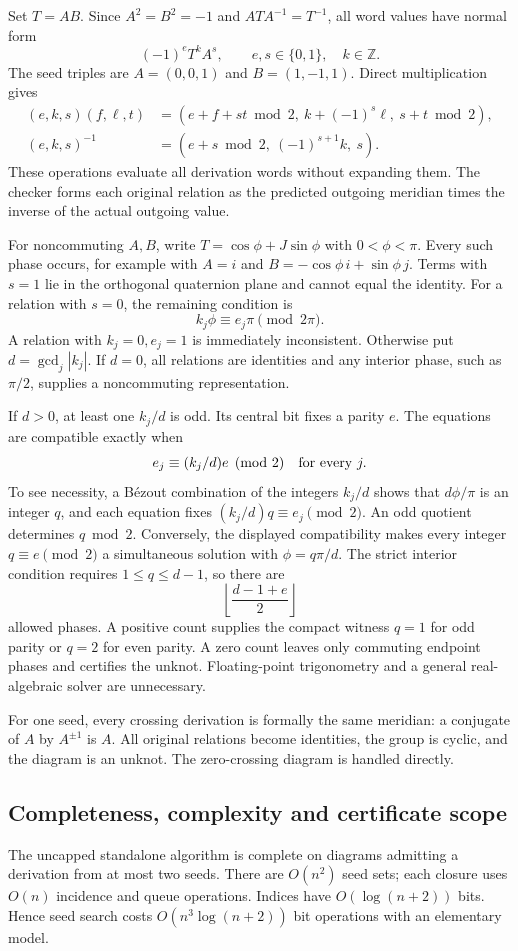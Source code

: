 Set $T=AB$. Since $A^2=B^2=-1$ and $ATA^{-1}=T^{-1}$, all word values have
normal form
\[
 (-1)^eT^kA^s,\qquad e,s\in\{0,1\},\quad k\in\mathbb Z.
\]
The seed triples are $A=(0,0,1)$ and $B=(1,-1,1)$. Direct multiplication gives
\begin{align*}
 (e,k,s)(f,\ell,t)&=(e+f+st\bmod2,\ k+(-1)^s\ell,\ s+t\bmod2),\\
 (e,k,s)^{-1}&=(e+s\bmod2,\ (-1)^{s+1}k,\ s).
\end{align*}
These operations evaluate all derivation words without expanding them.
The checker forms each original relation as the predicted outgoing meridian
times the inverse of the actual outgoing value.

For noncommuting $A,B$, write $T=\cos\phi+J\sin\phi$ with
$0<\phi<\pi$. Every such phase occurs, for example with
$A=i$ and $B=-\cos\phi\,i+\sin\phi\,j$. Terms with $s=1$ lie in the
orthogonal quaternion plane and cannot equal the identity. For a relation
with $s=0$, the remaining condition is
\[
 k_j\phi\equiv e_j\pi\pmod{2\pi}.
\]
A relation with $k_j=0,e_j=1$ is immediately inconsistent. Otherwise put
$d=\gcd_j|k_j|$. If $d=0$, all relations are identities and any interior
phase, such as $\pi/2$, supplies a noncommuting representation.

If $d>0$, at least one $k_j/d$ is odd. Its central bit fixes a parity $e$.
The equations are compatible exactly when
\[
 e_j\equiv(k_j/d)e\pmod2\quad\hbox{for every }j.
\]
To see necessity, a B\'ezout combination of the integers $k_j/d$ shows that
$d\phi/\pi$ is an integer $q$, and each equation fixes
$(k_j/d)q\equiv e_j\pmod2$. An odd quotient determines $q\bmod2$.
Conversely, the displayed compatibility makes every integer $q\equiv e\pmod2$
a simultaneous solution with $\phi=q\pi/d$.
The strict interior condition requires $1\le q\le d-1$, so there are
\[
 \left\lfloor\frac{d-1+e}{2}\right\rfloor
\]
allowed phases. A positive count supplies the compact witness $q=1$ for odd
parity or $q=2$ for even parity. A zero count leaves only commuting endpoint
phases and certifies the unknot. Floating-point trigonometry and a general
real-algebraic solver are unnecessary.

For one seed, every crossing derivation is formally the same meridian: a
conjugate of $A$ by $A^{\pm1}$ is $A$. All original relations become identities,
the group is cyclic, and the diagram is an unknot. The zero-crossing diagram
is handled directly.

\subsection{Completeness, complexity and certificate scope}
The uncapped standalone algorithm is complete on diagrams admitting a derivation from
at most two seeds. There are $O(n^2)$ seed sets; each closure uses $O(n)$
incidence and queue operations. Indices have $O(\log(n+2))$ bits. Hence seed
search costs $O(n^3\log(n+2))$ bit operations with an elementary model.

